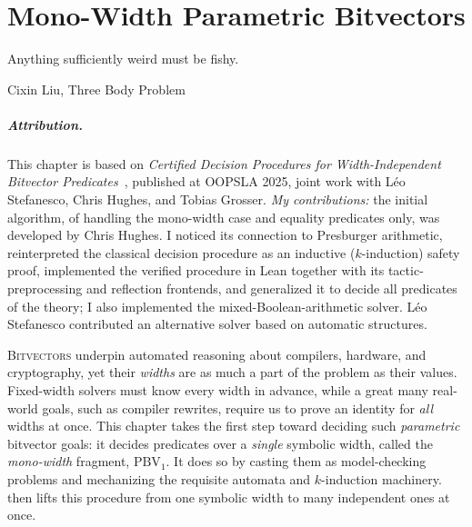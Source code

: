 \chapter{Mono-Width Parametric Bitvectors}
\label{ch:mono-width}
\epigraph{Anything sufficiently weird must be fishy.}{Cixin Liu, Three Body Problem}

\paragraph*{Attribution.} This chapter is based on \emph{Certified Decision
Procedures for Width-Independent Bitvector Predicates}~\citep{bhat2025certified},
published at OOPSLA 2025, joint work with Léo Stefanesco, Chris Hughes, and
Tobias Grosser.
\emph{My contributions:} the initial algorithm, of handling the mono-width case and
equality predicates only, was developed by Chris Hughes. I noticed its
connection to Presburger arithmetic, reinterpreted the classical decision
procedure as an inductive ($k$-induction) safety proof, implemented the verified
procedure in Lean together with its tactic-preprocessing and reflection
frontends, and generalized it to decide all predicates of the theory; I also
implemented the mixed-Boolean-arithmetic solver. Léo Stefanesco contributed an
alternative solver based on automatic structures.

\lettrine{B}{itvectors} underpin automated reasoning about compilers, hardware,
and cryptography, yet their \emph{widths} are as much a part of the problem as
their values. Fixed-width solvers must know every width in advance, while a
great many real-world goals, such as compiler rewrites,
require us to prove an identity for \emph{all} widths at once.
This chapter takes the first step toward deciding such \emph{parametric} bitvector goals: it decides
predicates over a \emph{single} symbolic width, called the \emph{mono-width} fragment,
$\text{PBV}_1$. It does so by casting them as model-checking problems and mechanizing the
requisite automata and $k$-induction machinery.  then
lifts this procedure from one symbolic width to many independent ones at once.

